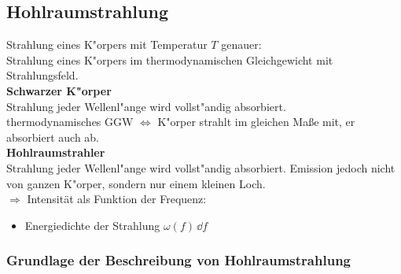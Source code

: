 











\subsection{Hohlraumstrahlung}  %

Strahlung eines K"orpers mit Temperatur $T$ genauer:\\[5pt]
Strahlung eines K"orpers im thermodynamischen Gleichgewicht mit Strahlungsfeld.\\[5pt]
\textbf{Schwarzer K"orper}\\
Strahlung jeder Wellenl"ange wird vollst"andig absorbiert.\\
thermodynamisches GGW $\Leftrightarrow$ K"orper strahlt im gleichen Maße mit, er absorbiert auch ab.\\[5pt]
\textbf{Hohlraumstrahler}\\
Strahlung jeder Wellenl"ange wird vollst"andig absorbiert. Emission jedoch nicht von ganzen K"orper, sondern nur einem kleinen Loch.\\[5pt]
$ \Rightarrow $ Intensität als Funktion der Frequenz:
\begin{itemize}
	\item Energiedichte der Strahlung $ \omega(f) \, \dd f $
\end{itemize}

\subsubsection{Grundlage der Beschreibung von Hohlraumstrahlung}

